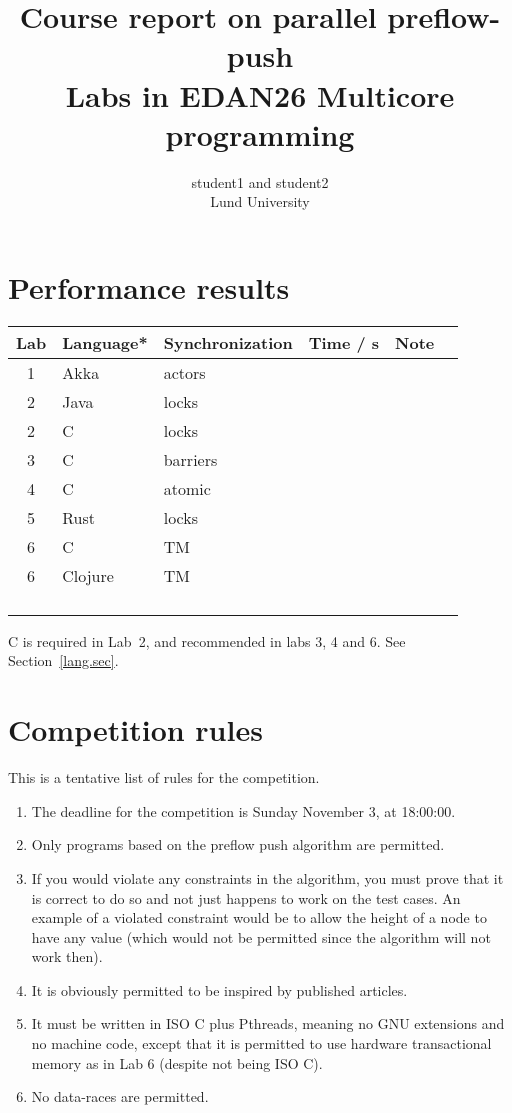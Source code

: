 \documentclass{forsete}
\author{student1 and student2\\Lund University}
\title{Course report on parallel preflow-push\\{\normalsize Labs in EDAN26 Multicore programming}}
\begin{document}
\maketitle

\tableofcontents

\section{Performance results}
\begin{center}
\begin{tabular}{|c|l|l|r|l|}
\hline
Lab & Language* & Synchronization & Time / s & Note \hspace{21mm} \ \\
\hline
1 & Akka & actors & & \\
\hline
2 & Java & locks & & \\
\hline
2 & C & locks & & \\
\hline
3 & C & barriers & & \\
\hline
4 & C & atomic & & \\
\hline
5 & Rust & locks & & \\
\hline
6 & C & TM & & \\
\hline
6 & Clojure & TM & & \\
\hline
  & & & & \\
\hline
  & & & & \\
\hline
  & & & & \\
\hline
  & & & & \\
\hline
\end{tabular}
\end{center}
\noindent * C is required in Lab~2, and recommended in labs 3, 4 and 6. See Section~\ref{lang.sec}. 

\section{Competition rules}
This is a tentative list of rules for the competition.
\begin{enumerate}
\item The deadline for the competition is Sunday November 3, at 18:00:00.

\item Only programs based on the preflow push algorithm are permitted.

\item If you would violate any constraints in the algorithm, you must prove that it is correct to do so and
not just happens to work on the test cases. An example of a violated constraint would be to allow the height 
of a node to have any value (which would not be permitted since the algorithm will not work then).

\item It is obviously permitted to be inspired by published articles.

\item It must be written in ISO C plus Pthreads, meaning no GNU extensions and no machine code, except that it is permitted to use
hardware transactional memory as in Lab 6 (despite not being ISO C).
\item No data-races are permitted.

\end{enumerate}
\end{document}
